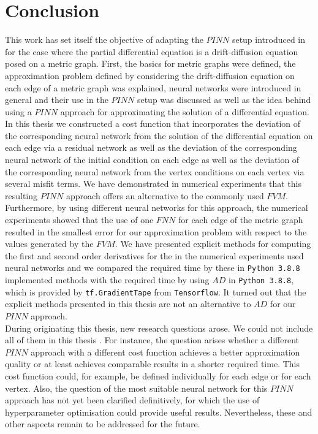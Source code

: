 \chapter{Conclusion}
\label{ch5}

This work has set itself the objective of adapting the $PINN$ setup introduced in \cite{RaissiPerdikarisKarniadakisPart1:2017} for the case where the partial differential equation is a drift-diffusion equation posed on a metric graph. First, the basics for metric graphs were defined, the approximation problem defined by considering the drift-diffusion equation on each edge of a metric graph was explained, neural networks were introduced in general and their use in the $PINN$ setup was discussed as well as the idea behind using a $PINN$ approach for approximating the solution of a differential equation. In this thesis we constructed a cost function that incorporates the deviation of the corresponding neural network from the solution of the differential equation on each edge via a residual network as well as the deviation of the corresponding neural network of the initial condition on each edge as well as the deviation of the corresponding neural network from the vertex conditions on each vertex via several misfit terms. We have demonstrated in numerical experiments that this resulting $PINN$ approach offers an alternative to the commonly used $FVM$. Furthermore, by using different neural networks for this approach, the numerical experiments showed that the use of one $FNN$ for each edge of the metric graph resulted in the smallest error for our approximation problem with respect to the values generated by the $FVM$. We have presented explicit methods for computing the first and second order derivatives for the in the numerical experiments used neural networks and we compared the required time by these in \lstinline!Python 3.8.8! implemented methods with the required time by using $AD$ in \lstinline!Python 3.8.8!, which is provided by \lstinline!tf.GradientTape! from \lstinline!Tensorflow!. It turned out that the explicit methods presented in this thesis are not an alternative to $AD$ for our $PINN$ approach. \\
During originating this thesis, new research questions arose. We could not include all of them in this thesis \cite[p.~65]{Wagner20}. For instance, the question arises whether a different $PINN$ approach with a different cost function achieves a better approximation quality or at least achieves comparable results in a shorter required time. This cost function could, for example, be defined individually for each edge or for each vertex. Also, the question of the most suitable neural network for this $PINN$ approach has not yet been clarified definitively, for which the use of hyperparameter optimisation could provide useful results. Nevertheless, these and other aspects remain to be addressed for the future.  \\


